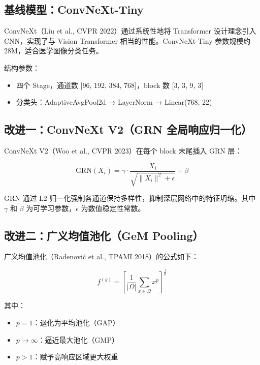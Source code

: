 \documentclass[12pt,a4paper]{report}
\begin{document}
\subsection{基线模型：ConvNeXt-Tiny}

ConvNeXt（Liu et al., CVPR 2022）通过系统性地将 Transformer 设计理念引入 CNN，实现了与 Vision Transformer 相当的性能。ConvNeXt-Tiny 参数规模约 28M，适合医学图像分类任务。

结构参数：
\begin{itemize}[leftmargin=2em, itemsep=0.2em]
    \item 四个 Stage，通道数 [96, 192, 384, 768]，block 数 [3, 3, 9, 3]
    \item 分类头：AdaptiveAvgPool2d → LayerNorm → Linear(768, 22)
\end{itemize}

\subsection{改进一：ConvNeXt V2（GRN 全局响应归一化）}

ConvNeXt V2（Woo et al., CVPR 2023）在每个 block 末尾插入 GRN 层：

\begin{equation}
\text{GRN}(X_i) = \gamma \cdot \frac{X_i}{\sqrt{\|X_i\|^2 + \epsilon}} + \beta
\end{equation}

GRN 通过 L2 归一化强制各通道保持多样性，抑制深层网络中的特征坍缩。其中 $\gamma$ 和 $\beta$ 为可学习参数，$\epsilon$ 为数值稳定性常数。

\subsection{改进二：广义均值池化（GeM Pooling）}

广义均值池化（Radenović et al., TPAMI 2018）的公式如下：

\begin{equation}
f^{(g)} = \left[ \frac{1}{|\Omega|} \sum_{x \in \Omega} x^p \right]^{\frac{1}{p}}
\end{equation}

其中：
\begin{itemize}[leftmargin=2em, itemsep=0.2em]
    \item $p=1$：退化为平均池化（GAP）
    \item $p \to \infty$：逼近最大池化（GMP）
    \item $p>1$：赋予高响应区域更大权重
\end{itemize}
\end{document}
